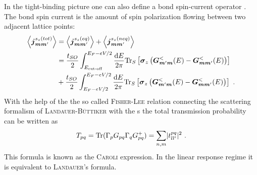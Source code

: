 In the tight-binding picture one can also define a bond spin-current operator \cite{EPL.80.47001}. The bond spin current is the amount of spin polarization flowing between two adjacent lattice points:
\begin{align}
\left< \boldsymbol{j}_{\boldsymbol{m}\boldsymbol{m}'}^{s_z(tot)} \right> &=\left< \boldsymbol{j}_{\boldsymbol{m}\boldsymbol{m}'}^{s_z(eq)} \right>+ \left< \boldsymbol{j}_{\boldsymbol{m}\boldsymbol{m}'}^{s_z(neq)} \right>\\
	&=\frac{t_{SO}}{2} \int_{E_{\text{cut-off}}}^{E_F-eV/2} \frac{\text{d}E}{2 \pi} \text{Tr}_S \left[\boldsymbol{\sigma}_z\left(\boldsymbol{G}^<_{\boldsymbol{m}'\boldsymbol{m}}(E)- \boldsymbol{G}^<_{\boldsymbol{m}\boldsymbol{m}'}(E)\right)\right]\\
	&+\frac{t_{SO}}{2} \int_{E_F-eV/2}^{E_F-eV/2} \frac{\text{d}E}{2 \pi} \text{Tr}_S \left[\boldsymbol{\sigma}_z\left(\boldsymbol{G}^<_{\boldsymbol{m}'\boldsymbol{m}}(E)- \boldsymbol{G}^<_{\boldsymbol{m}\boldsymbol{m}'}(E)\right)\right] \ .
	\label{eqn:gfnccurrent}
\end{align}
With the help of the the so called \textsc{Fisher-Lee} relation \cite{PhysRevB.23.6851} connecting the scattering formalism of \textsc{Landauer-B\"uttiker} with the \gfnc s the total transmission probability can be written as
\begin{align}
T_{pq} = \text{Tr}(\Gamma_p G_{pq} \Gamma_q G^+_{pq}) = \sum_{n,m} \lvert t^{pq}_{ll'}\rvert^2\ .
\label{eqn:transmissionfunction}
\end{align}
This formula is known as the \textsc{Caroli} expression. In the linear response regime it is equivalent to \textsc{Landauer}'s formula\cite{PhysRevB.72.035450}.
